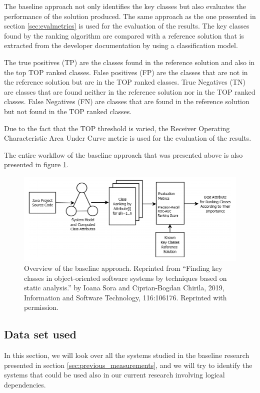 \documentclass[12pt]{mitthesis}
\begin{document}
The baseline approach not only identifies the key classes but also evaluates the performance of the solution produced. 
The same approach as the one presented in section \ref{sec:evalmetrics} is used for the evaluation of the results. The key classes found by the ranking algorithm are compared with a reference solution that is extracted from the developer documentation by using a classification model.

The true positives (TP) are the classes found in the reference solution and also in the top TOP ranked classes. False positives (FP) are the classes that are not in the reference solution but are in the TOP ranked classes.
True Negatives (TN) are classes that are found neither in the reference solution nor in the TOP ranked classes. False Negatives (FN) are classes that are found in the reference solution but not found in the TOP ranked classes.


Due to the fact that the TOP threshold is varied, the Receiver Operating Characteristic Area Under Curve metric is used for the evaluation of the results.

The entire workflow of the baseline approach that was presented above is also presented in figure \ref{fig:baseline_approach}.

\begin{figure}[H]
\centering
\includegraphics[width=\textwidth]{baseline_approach.PNG}
\caption{Overview of the baseline approach. Reprinted from “Finding key classes in object-oriented
software systems by techniques based on static analysis.” by Ioana Sora and Ciprian-Bogdan Chirila, 2019, Information and Software Technology, 116:106176. Reprinted with permission. }
\label{fig:baseline_approach}
\centering
\end{figure}



\subsection{Data set used}
\label{sec:dataset}
In this section, we will look over all the systems studied in the baseline research presented in section \ref{sec:previous_measurements}, and we will try to identify the systems that could be used also in our current research involving logical dependencies.
\end{document}
